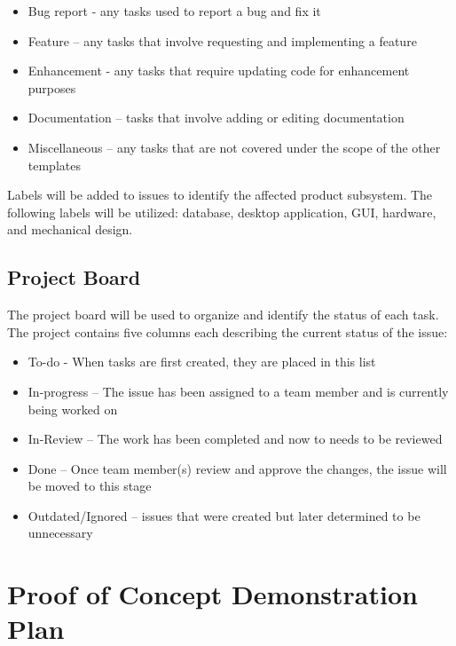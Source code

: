 \documentclass[12pt]{article}
\begin{document}
\begin{itemize}
	\item Bug report - any tasks used to report a bug and fix it
	\item Feature – any tasks that involve requesting and implementing a feature
	\item Enhancement - any tasks that require updating code for enhancement purposes
	\item Documentation – tasks that involve adding or editing documentation
	\item Miscellaneous – any tasks that are not covered under the scope of the other templates
\end{itemize}

\noindent
Labels will be added to issues to identify the affected product subsystem. The following labels will be utilized: 
database, desktop application, GUI, hardware, and mechanical design.

\subsection{Project Board}
The project board will be used to organize and identify the status of each task. 
The project contains five columns each describing the current status of the issue:

\begin{itemize}
	\item To-do - When tasks are first created, they are placed in this list
	\item In-progress – The issue has been assigned to a team member and is currently being worked on
	\item In-Review – The work has been completed and now to needs to be reviewed
	\item Done – Once team member(s) review and approve the changes, the issue will be moved to this stage
	\item Outdated/Ignored – issues that were created but later determined to be unnecessary 
\end{itemize}

\newpage

\section{Proof of Concept Demonstration Plan}
\end{document}
